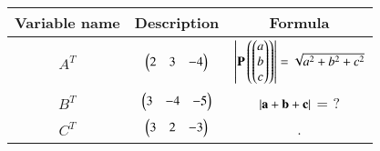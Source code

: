 \begin{tabular}[12pt]{|c|c|c|}
    \hline
    \textbf{Variable name} & \textbf{Description} & \textbf{Formula}\\ 
    \hline
		$A^T$ & $\begin{pmatrix}2 & 3 & -4\end{pmatrix}$ &  $\left\vert\mathbf{P}\left(\begin{pmatrix}a\\b\\c\end{pmatrix}\right)\right\vert=\sqrt{a^2+b^2+c^2}$\\
    \hline 
		$B^T$ & $\begin{pmatrix}3 & -4 & -5\end{pmatrix}$ & $\left\vert\mathbf{a+b+c}\right\vert$ = ? \\
    \hline
		$C^T$ & $\begin{pmatrix}3 & 2 & -3\end{pmatrix}$ & .  \\
    \hline   
\end{tabular}

